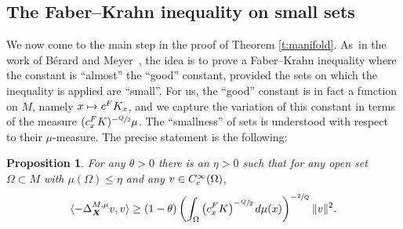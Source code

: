 \documentclass[11pt]{article}
\newcommand\mto{\mathchoice{\longmapsto}{\mapsto}{\mapsto}{\mapsto}}
\let\oldsfrac\sfrac
\renewcommand{\sfrac}[2]{{\oldsfrac{#1}{#2}}}
\newcommand{\rc}{\textup{c}}
\newcommand{\FK}{\textup{FK}}
\newcommand{\bX}{{\boldsymbol{X}}}
\newtheorem{proposition}[theorem]{Proposition}
\theoremstyle{definition}
\let\Xb\bX
\newcommand{\1}{\mathbbm{1}}
\numberwithin{equation}{section}
\begin{document}
\subsection{The Faber--Krahn inequality on small sets}
We now come to the main step in the proof of Theorem \ref{t:manifold}. As~in the work of Bérard and Meyer~\cite{BerMe}, the idea is to prove a Faber--Krahn inequality where the constant is ``almost'' the ``good'' constant, provided the sets on which the inequality is applied are ``small''. For us, the ``good'' constant is in fact a function on $M$, namely $x\mto c^\FK_x$, and we capture the variation of this constant in terms of the measure $(c_x^\FK)^{-\sfrac Q2}\mu$. The ``smallness'' of sets is understood with respect to their $\mu$-measure. The precise statement is the following:

\begin{proposition}\label{faberkrahnbm}
For any $\theta>0$ there is an $\eta>0$ such that for any open set $\Omega\subset M$ with $\mu(\Omega)\leq\eta$ and any $v\in C^\infty_\rc(\Omega)$,
\begin{equation}
\langle -\Delta^{M,\mu}_\Xb v,v \rangle \geq (1-\theta) \left(\int_\Omega \left(c_x^\FK\right)^{-\sfrac Q2} d\mu(x)\right)^{-\sfrac2Q} \| v\|^2.
\end{equation}
\end{proposition}
\end{document}
